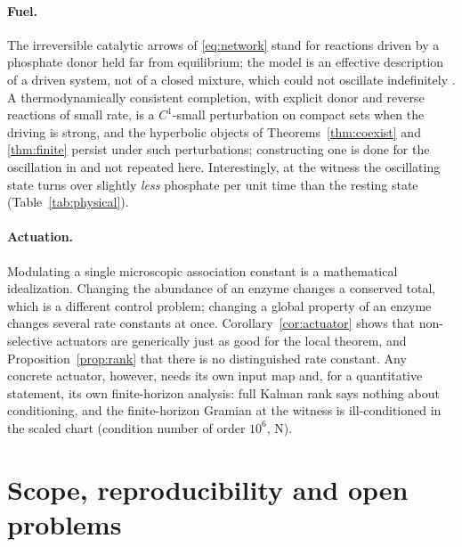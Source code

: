 \documentclass[11pt,a4paper]{article}
\theoremstyle{plain}
\theoremstyle{definition}
\theoremstyle{remark}
\newcommand{\evN}{\textsf{N}}
\begin{document}
\paragraph{Fuel.} The irreversible catalytic arrows of \eqref{eq:network} stand for reactions driven by a phosphate donor held far from equilibrium; the model is an effective description of a driven system, not of a closed mixture, which could not oscillate indefinitely \cite{RaoEsposito16}. A thermodynamically consistent completion, with explicit donor and reverse reactions of small rate, is a $C^1$-small perturbation on compact sets when the driving is strong, and the hyperbolic objects of Theorems~\ref{thm:coexist} and \ref{thm:finite} persist under such perturbations; constructing one is done for the oscillation in \cite{CompanionOscillations} and not repeated here. Interestingly, at the witness the oscillating state turns over slightly \emph{less} phosphate per unit time than the resting state (Table~\ref{tab:physical}).

\paragraph{Actuation.} Modulating a single microscopic association constant is a mathematical idealization. Changing the abundance of an enzyme changes a conserved total, which is a different control problem; changing a global property of an enzyme changes several rate constants at once. Corollary~\ref{cor:actuator} shows that non-selective actuators are generically just as good for the local theorem, and Proposition~\ref{prop:rank} that there is no distinguished rate constant. Any concrete actuator, however, needs its own input map and, for a quantitative statement, its own finite-horizon analysis: full Kalman rank says nothing about conditioning, and the finite-horizon Gramian at the witness is ill-conditioned in the scaled chart (condition number of order $10^6$, \evN).

\section{Scope, reproducibility and open problems}\label{sec:repro}
\end{document}
